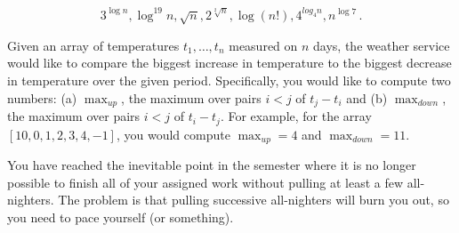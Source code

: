 \documentclass[12pt,answers,addpoints]{exam}
\begin{document}
\begin{questions}
\begin{parts}
    \[3^{\log n}, \log^{19}n, \sqrt n, 2^{\sqrt[2]{n}}, \log(n!),
      4^{log_4 n}, n^{\log 7} \, .\]

    \vskip 3cm
    
  \end{parts}

  \newpage

\question Given an array of temperatures $t_1, \ldots, t_n$ measured
  on $n$ days, the weather service would like to compare the biggest
  increase in temperature to the biggest decrease in temperature over
  the given period. Specifically, you would like to compute two
  numbers: (a) $\max_{up}$, the maximum over pairs $i < j$ of
  $t_j - t_i$ and (b) $\max_{down}$, the maximum over pairs $i < j$ of
  $t_i - t_j$. For example, for the array $[10, 0, 1, 2, 3, 4, -1]$,
  you would compute $\max_{up} = 4$ and $\max_{down} = 11$.



  \newpage

  \question[20] You have reached the inevitable point in the semester
  where it is no longer possible to finish all of your assigned work
  without pulling at least a few all-nighters. The problem is that
  pulling successive all-nighters will burn you out, so you need to
  pace yourself (or something).


\end{questions}
\end{document}
